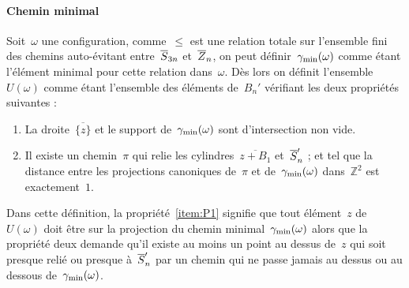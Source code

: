 		\paragraph{Chemin minimal}
			Soit~$\omega$ une configuration, comme~$\leq$ est une relation totale sur l'ensemble fini des chemins auto-évitant entre~$\SnB$ et~$\ZnB$, on peut définir~$\Cmin$ comme étant l'élément minimal pour cette relation dans~$\omega$. Dès lors on définit l'ensemble~$U(\omega)$ comme étant l'ensemble des éléments de~$B_n'$ vérifiant les deux propriétés suivantes :
			\begin{enumerate}[label=P\arabic*.]
				\item\label{item:P1} La droite~$\overline{\{z\}}$ et le support de~$\Cmin$ sont d'intersection non vide.
				\item\label{item:P2} Il existe un chemin~$\pi$ qui relie les cylindres~$\overline{z+B_1}$ et~$\SnB[n]'$ ; et tel que la distance entre les projections canoniques de~$\pi$ et de~$\Cmin$ dans~$\mathbb{Z}^2$ est exactement~$1$.
			\end{enumerate}
			Dans cette définition, la propriété~\ref{item:P1} signifie que tout élément~$z$ de~$U(\omega)$ doit être sur la projection du chemin minimal~$\Cmin$ alors que la propriété deux demande qu'il existe au moins un point au dessus de~$z$ qui soit presque relié ou presque à~$\SnB[n]'$ par un chemin qui ne passe jamais au dessus ou au dessous de~$\Cmin$.
		
		\boldmath
